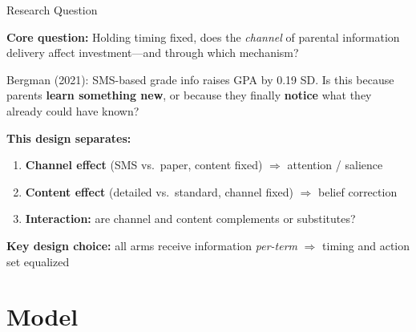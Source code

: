 \documentclass[aspectratio=169,11pt]{beamer}
\begin{document}
\begin{frame}{Research Question}

\textbf{Core question:} Holding timing fixed, does the \emph{channel} of parental information delivery affect investment---and through which mechanism?

\bigskip

Bergman (2021): SMS-based grade info raises GPA by 0.19 SD. Is this because parents \textbf{learn something new}, or because they finally \textbf{notice} what they already could have known?

\bigskip

\textbf{This design separates:}
\begin{enumerate}
    \item \textbf{Channel effect} (SMS vs.\ paper, content fixed) $\Rightarrow$ attention / salience

    \medskip

    \item \textbf{Content effect} (detailed vs.\ standard, channel fixed) $\Rightarrow$ belief correction

    \medskip

    \item \textbf{Interaction:} are channel and content complements or substitutes?
\end{enumerate}

\bigskip

\textbf{Key design choice:} all arms receive information \emph{per-term} $\Rightarrow$ timing and action set equalized

\end{frame}

\section{Model}
\end{document}
